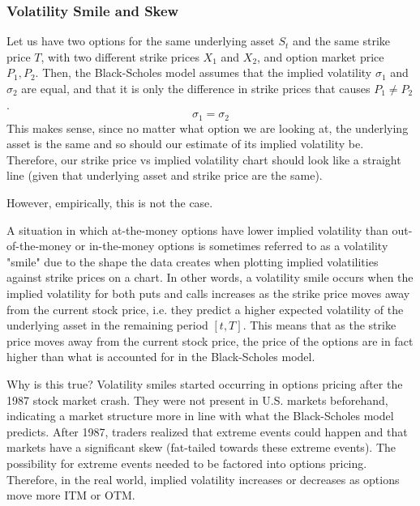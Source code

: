 \documentclass{article}
\begin{document}
\subsubsection{Volatility Smile and Skew}

Let us have two options for the same underlying asset $S_t$ and the same strike price $T$, with two different strike prices $X_1$ and $X_2$, and option market price $P_1, P_2$. Then, the Black-Scholes model assumes that the implied volatility $\sigma_1$ and $\sigma_2$ are equal, and that it is only the difference in strike prices that causes $P_1 \neq P_2$. 
\[\sigma_1 = \sigma_2\]
This makes sense, since no matter what option we are looking at, the underlying asset is the same and so should our estimate of its implied volatility be. Therefore, our strike price vs implied volatility chart should look like a straight line (given that underlying asset and strike price are the same). 
\begin{center}
\end{center}

However, empirically, this is not the case. 

\begin{definition}
A situation in which at-the-money options have lower implied volatility than out-of-the-money or in-the-money options is sometimes referred to as a volatility "smile" due to the shape the data creates when plotting implied volatilities against strike prices on a chart. In other words, a volatility smile occurs when the implied volatility for both puts and calls increases as the strike price moves away from the current stock price, i.e. they predict a higher expected volatility of the underlying asset in the remaining period $[t, T]$. This means that as the strike price moves away from the current stock price, the price of the options are in fact higher than what is accounted for in the Black-Scholes model. 
\begin{center}
\end{center}
\end{definition}

Why is this true? Volatility smiles started occurring in options pricing after the 1987 stock market crash. They were not present in U.S. markets beforehand, indicating a market structure more in line with what the Black-Scholes model predicts. After 1987, traders realized that extreme events could happen and that markets have a significant skew (fat-tailed towards these extreme events). The possibility for extreme events needed to be factored into options pricing. Therefore, in the real world, implied volatility increases or decreases as options move more ITM or OTM. 
\end{document}
